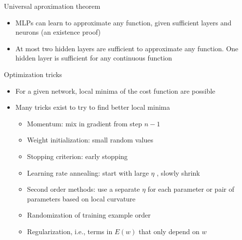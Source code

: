 \documentclass[notes]{beamer}
\providecommand{\tightlist}{%
  \setlength{\itemsep}{0pt}\setlength{\parskip}{0pt}}
\begin{document}
\begin{frame}{Universal aproximation theorem}

\begin{itemize}
\tightlist
\item
  MLPs can learn to approximate any function, given sufficient layers
  and neurons (an existence proof)
\item
  At most two hidden layers are sufficient to approximate any function.
  One hidden layer is sufficient for any continuous function
\end{itemize}

\end{frame}

\begin{frame}{Optimization tricks}

\begin{itemize}
\tightlist
\item
  For a given network, local minima of the cost function are possible
\item
  Many tricks exist to try to find better local minima

  \begin{itemize}
  \tightlist
  \item
    Momentum: mix in gradient from step \(n - 1\)
  \item
    Weight initialization: small random values
  \item
    Stopping criterion: early stopping
  \item
    Learning rate annealing: start with large \(\eta\) , slowly shrink
  \item
    Second order methods: use a separate \(\eta\) for each parameter or
    pair of parameters based on local curvature
  \item
    Randomization of training example order
  \item
    Regularization, i.e., terms in \(E(w)\) that only depend on \(w\)
  \end{itemize}
\end{itemize}

\end{frame}
\end{document}
